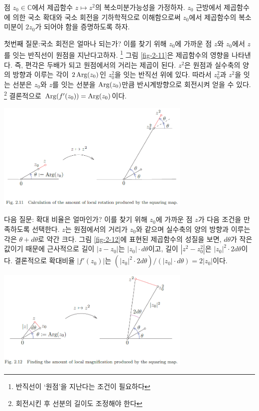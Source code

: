 \begin{saltexample}[label=example-2-12]{}{}
점 $z_0\in\mathbb C$에서 제곱함수  $z\mapsto z^2$의
복소미분가능성을 가정하자.
$z_0$ 근방에서 제곱함수에 의한  국소 확대와 국소 회전을 기하학적으로 이해함으로써
$z_0$에서 제곱함수의 복소미분이 $2z_0$가 되어야 함을 증명하도록 하자.

첫번째 질문:국소 회전은 얼마나 되는가?
이를 찾기 위해 $z_0$에 가까운 점 $z$와 $z_0$에서 $z$를 잇는 반직선이 원점을 지난다고하자.
\footnote{반직선이 `원점'을 지난다는 조건이 필요하다}
그림 \ref{fig-2-11}은 제곱함수의 영향을 나타낸다. 즉, 편각은 두배가 되고
원점에서의 거리는 제곱이 된다. 
 $z^2$은 원점과 
실수축의 양의 방향과 이루는 각이 $2\mathop{\mathrm{Arg}}(z_0)$인
$z_0^2$을 잇는 반직선 위에 있다.
따라서 $z_0^2$과 $z^2$을 잇는 선분은 
$z_0$와  $z$를 잇는 선분을 $\mathop{\mathrm{Arg}}(z_0)$만큼 반시계방향으로 회전시켜 얻을 수 있다. 
\footnote{회전시킨 후 선분의 길이도 조정해야 한다}
결론적으로  $\mathop{\mathrm{Arg}}(f'(z_0)) = \mathop{\mathrm{Arg}}(z_0)$이다.

\begin{center}
\includegraphics[width=0.7\textwidth]{./SaltChapter/fig-2-11}
\end{center}
\label{fig-2-11}


다음 질문: 확대 비율은 얼마인가?
이를 찾기 위해 $z_0$에 가까운 점 $z$가 다음 조건을 만족하도록 선택한다.
$z$는 원점에서의 거리가 $z_0$와 같으며 
실수축의 양의 방향과 이루는 각은 $\theta + d\theta$로 약간 크다.
그림 \ref{fig-2-12}에 표현된 제곱함수의 성질을 보면,
$d\theta$가 작은 값이기 때문에 근사적으로 길이 $|z-z_0|$는  $|z_0|\cdot d\theta$이고,
길이 $|z^2-z_0^2|$은 $|z_0|^2\cdot 2d\theta$이다.
결론적으로 확대비율 $|f'(z_0)|$는 $(|z_0|^2\cdot 2d\theta)/(|z_0|\cdot d\theta) = 2|z_0|$이다.


\begin{center}
\includegraphics[width=0.7\textwidth]{./SaltChapter/fig-2-12}
\end{center}
\label{fig-2-12}


\end{saltexample}
